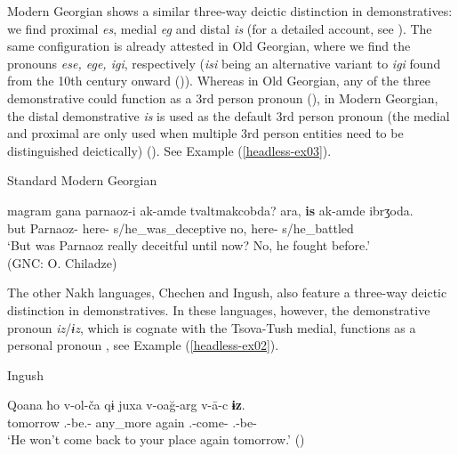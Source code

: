 Modern Georgian shows a similar three-way deictic distinction in demonstratives: we find proximal \textit{es}, medial \textit{eg} and distal \textit{is} (for a detailed account, see \cite[]{martirosov64pronoun}). The same configuration is already attested in Old Georgian, where we find the pronouns \textit{ese, ege, igi}, respectively (\textit{isi} being an alternative variant to \textit{igi} found from the 10th century onward (\cite{gippertOGeo})). Whereas in Old Georgian, any of the three demonstrative could function as a 3rd person pronoun (\cite{gippertOGeo}), in Modern Georgian, the distal demonstrative \textit{is} is used as the default 3rd person pronoun (the medial and proximal are only used when multiple 3rd person entities need to be distinguished deictically) (\cite[599]{faehnrich12}).
See Example (\ref{headless-ex03}).

\begin{exe}
	\ex\label{headless-ex03}
	Standard Modern Georgian
    
	\gll  magram gana parnaoz-i ak-amde tvaltmakcobda? ara, \textbf{is} ak-amde ibrʒoda. \\
	but {\Q} Parnaoz-{\Nom} here-{\Term} s/he\_was\_deceptive no, \textbf{{\Dist}} here-{\Term} s/he\_battled \\
	\trans `But was Parnaoz really deceitful until now? No, he fought before.' \\
	\hfill (GNC: O. Chiladze)
\end{exe}

The other Nakh languages, Chechen and Ingush, also feature a three-way deictic distinction in demonstratives. In these languages, however, the demonstrative pronoun \textit{iz}/\textit{ɨz}, which is cognate with the Tsova-Tush medial, functions as a personal pronoun \parencites[174, 179]{nichols11}[34]{nichols94Che}, see Example (\ref{headless-ex02}).

\begin{exe}
	
	\ex\label{headless-ex02}
	Ingush
    
	\gll Qoana ħo v-ol-ča qɨ juxa v-oa\u{g}-arg v-\={a}-c \textbf{ɨz}. \\
	tomorrow {\Ssg} {\M}.{\Sg}-be.{\Ptcp}-{\Obl} any\_more again {\M}.{\Sg}-come-{\Fut} {\M}.{\Sg}-be-{\Neg} \textbf{{\Tsg}} \\
	\trans `He won't come back to your place again tomorrow.'
	\hfill (\cite{dumezil36})
	
\end{exe}

